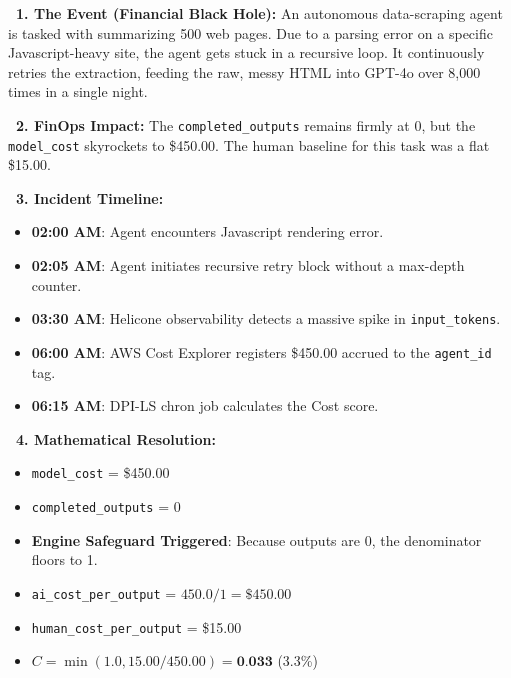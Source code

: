 \documentclass[11pt,a4paper]{article}
\begin{document}
\begin{tcolorbox}[enhanced, colback=dpired!5!white, colframe=dpired, title={\textbf{\faExclamationCircle\ Scenario 1: The Infinite Hallucination Loop (Runaway Spend)}}, fonttitle=\bfseries, boxrule=1pt, arc=2mm, drop shadow]
\textbf{\color{dpired}\faFire\ 1. The Event (Financial Black Hole):} 
An autonomous data-scraping agent is tasked with summarizing 500 web pages. Due to a parsing error on a specific Javascript-heavy site, the agent gets stuck in a recursive loop. It continuously retries the extraction, feeding the raw, messy HTML into GPT-4o over 8,000 times in a single night.

\vspace{0.2cm}
\textbf{\color{dpiblue}\faMoneyBillWave\ 2. FinOps Impact:} 
The \texttt{completed\_outputs} remains firmly at $0$, but the \texttt{model\_cost} skyrockets to \$450.00. The human baseline for this task was a flat \$15.00. 

\vspace{0.2cm}
\textbf{\color{dpigreen}\faClock\ 3. Incident Timeline:}
\begin{itemize}
    \item \textbf{02:00 AM}: Agent encounters Javascript rendering error.
    \item \textbf{02:05 AM}: Agent initiates recursive retry block without a max-depth counter.
    \item \textbf{03:30 AM}: Helicone observability detects a massive spike in \texttt{input\_tokens}.
    \item \textbf{06:00 AM}: AWS Cost Explorer registers \$450.00 accrued to the \texttt{agent\_id} tag.
    \item \textbf{06:15 AM}: DPI-LS chron job calculates the Cost score.
\end{itemize}

\vspace{0.2cm}
\textbf{\color{dpiteal}\faCalculator\ 4. Mathematical Resolution:}
\begin{itemize}
    \item \texttt{model\_cost} = \$450.00
    \item \texttt{completed\_outputs} = 0
    \item \textbf{Engine Safeguard Triggered}: Because outputs are 0, the denominator floors to 1. 
    \item \texttt{ai\_cost\_per\_output} = $450.0 / 1 = \$450.00$
    \item \texttt{human\_cost\_per\_output} = \$15.00
    \item $C = \min(1.0, 15.00 / 450.00) = \textbf{0.033}$ (3.3\%)
\end{itemize}


\end{tcolorbox}
\end{document}
